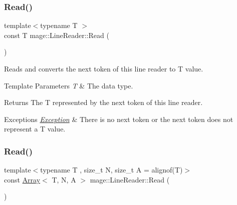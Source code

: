 \mbox{\label{classmage_1_1_line_reader_a9bbad433ab93ce012aec7155adafbedb}} 
\subsubsection{\texorpdfstring{Read()}{Read()}\hspace{0.1cm}{\footnotesize\ttfamily [1/2]}}
{\footnotesize\ttfamily template$<$typename T $>$ \\
const T mage\+::\+Line\+Reader\+::\+Read (\begin{DoxyParamCaption}{ }\end{DoxyParamCaption})\hspace{0.3cm}{\ttfamily [protected]}}

Reads and converts the next token of this line reader to {\ttfamily T} value.


\begin{DoxyTemplParams}{Template Parameters}
{\em T} & The data type. \\
\hline
\end{DoxyTemplParams}
\begin{DoxyReturn}{Returns}
The {\ttfamily T} represented by the next token of this line reader. 
\end{DoxyReturn}

\begin{DoxyExceptions}{Exceptions}
{\em \mbox{\hyperlink{classmage_1_1_exception}{Exception}}} & There is no next token or the next token does not represent a {\ttfamily T} value. \\
\hline
\end{DoxyExceptions}
\mbox{\label{classmage_1_1_line_reader_a208eb25a7715761178317eec72c93c75}} 
\subsubsection{\texorpdfstring{Read()}{Read()}\hspace{0.1cm}{\footnotesize\ttfamily [2/2]}}
{\footnotesize\ttfamily template$<$typename T , size\+\_\+t N, size\+\_\+t A = alignof(\+T)$>$ \\
const \mbox{\hyperlink{structmage_1_1_array}{Array}}$<$ T, N, A $>$ mage\+::\+Line\+Reader\+::\+Read (\begin{DoxyParamCaption}{ }\end{DoxyParamCaption})\hspace{0.3cm}{\ttfamily [protected]}}

